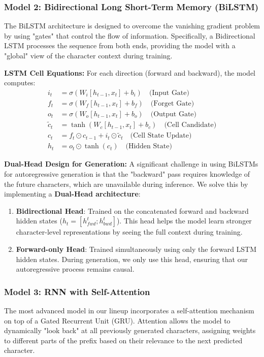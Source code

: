 \documentclass[12pt,a4paper]{article}
\begin{document}
\subsubsection{Model 2: Bidirectional Long Short-Term Memory (BiLSTM)}
The BiLSTM architecture is designed to overcome the vanishing gradient problem by using "gates" that control the flow of information. Specifically, a Bidirectional LSTM processes the sequence from both ends, providing the model with a "global" view of the character context during training.

\textbf{LSTM Cell Equations:}
For each direction (forward and backward), the model computes:
\begin{align}
    i_t &= \sigma(W_i [h_{t-1}, x_t] + b_i) \quad \text{(Input Gate)} \\
    f_t &= \sigma(W_f [h_{t-1}, x_t] + b_f) \quad \text{(Forget Gate)} \\
    o_t &= \sigma(W_o [h_{t-1}, x_t] + b_o) \quad \text{(Output Gate)} \\
    \tilde{c}_t &= \tanh(W_c [h_{t-1}, x_t] + b_c) \quad \text{(Cell Candidate)} \\
    c_t &= f_t \odot c_{t-1} + i_t \odot \tilde{c}_t \quad \text{(Cell State Update)} \\
    h_t &= o_t \odot \tanh(c_t) \quad \text{(Hidden State)}
\end{align}

\textbf{Dual-Head Design for Generation:}
A significant challenge in using BiLSTMs for autoregressive generation is that the "backward" pass requires knowledge of the future characters, which are unavailable during inference. We solve this by implementing a \textbf{Dual-Head architecture}:
\begin{enumerate}
    \item \textbf{Bidirectional Head}: Trained on the concatenated forward and backward hidden states ($h_t = [h_{fwd}^t; h_{bwd}^t]$). This head helps the model learn stronger character-level representations by seeing the full context during training.
    \item \textbf{Forward-only Head}: Trained simultaneously using only the forward LSTM hidden states. During generation, we only use this head, ensuring that our autoregressive process remains causal.
\end{enumerate}

\subsubsection{Model 3: RNN with Self-Attention}
The most advanced model in our lineup incorporates a self-attention mechanism on top of a Gated Recurrent Unit (GRU). Attention allows the model to dynamically "look back" at all previously generated characters, assigning weights to different parts of the prefix based on their relevance to the next predicted character.
\end{document}
